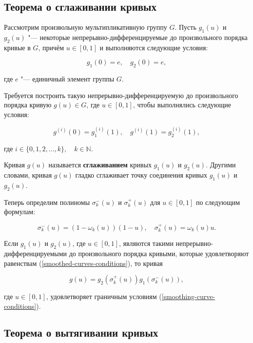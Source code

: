 \subsection*{Теорема о сглаживании кривых}

Рассмотрим произвольную мультипликативную группу $G$. Пусть $g_1(u)$ и $g_2(u)$ "--- некоторые
непрерывно-дифференцируемые до произвольного порядка кривые в $G$, причём $u \in [0,1]$ и выполняются следующие условия:

\begin{equation}
g_1(0)=e, \quad g_2(0)=e,
\label{smoothed-curves-conditions}
\end{equation}

\noindent где $e$ "--- единичный элемент группы $G$.

Требуется построить такую непрерывно-дифференцируемую до произвольного порядка кривую $g(u)\in G$, где $u \in [0,1]$,
чтобы выполнялись следующие условия:

\begin{equation}
g^{(i)}(0)=g_1^{(i)}(1), \quad g^{(i)}(1)=g_2^{(i)}(1),
\label{smoothing-curve-conditions}
\end{equation}

\noindent где $i \in \{0,1,2,\dots,k\},\quad k\in\mathbb{N}$.

\begin{definition}
Кривая $g(u)$ называется \textbf{сглаживанием} кривых $g_1(u)$ и $g_2(u)$. Другими словами, кривая $g(u)$ гладко
сглаживает точку соединения кривых $g_1(u)$ и $g_2(u)$.
\end{definition}

Теперь определим полиномы $\sigma_k^-(u)$ и $\sigma_k^+(u)$ для $u \in [0,1]$ по следующим формулам:

$$
\sigma_k^-(u)=(1-\omega_k(u))(1-u), \quad \sigma_k^+(u)=\omega_k(u)u.
$$

\begin{theorem}
Если $g_1(u)$ и $g_2(u)$, где $u \in [0,1]$, являются такими непрерывно-дифференцируемыми до произвольного порядка
кривыми, которые удовлетворяют равенствам (\ref{smoothed-curves-conditions}), то кривая

$$
g(u)=g_2(\sigma_k^+(u))g_1(\sigma_k^-(u)),
$$

\noindent где $u \in [0,1]$, удовлетворяет граничным условиям (\ref{smoothing-curve-conditions}).
\end{theorem}

\subsection*{Теорема о вытягивании кривых}

